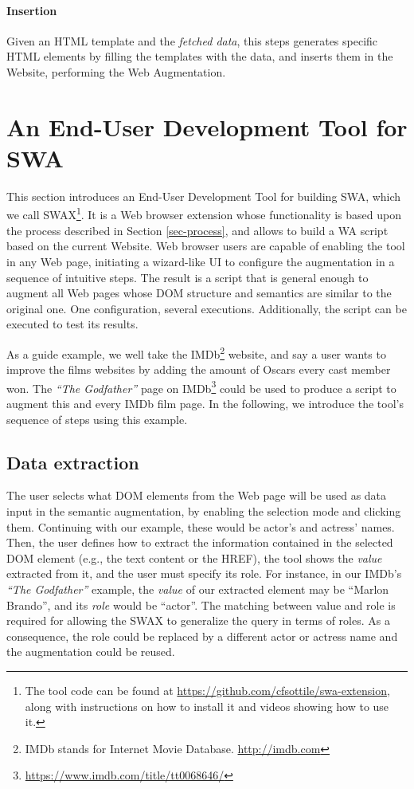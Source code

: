 \documentclass[runningheads]{llncs}
\begin{document}
\paragraph{Insertion} Given an HTML template and the \textit{fetched data}, this steps generates specific HTML elements by filling the templates with the data, and inserts them in the Website, performing the Web Augmentation.


\section{An End-User Development Tool for SWA}
\label{sec-tool}

This section introduces an End-User Development Tool for building SWA, which we call SWAX\footnote{The tool code can be found at \url{https://github.com/cfsottile/swa-extension}, along with instructions on how to install it and videos showing how to use it.
}. It is a Web browser extension whose functionality is based upon the process described in Section \ref{sec-process}, and allows to build a WA script based on the current Website. Web browser users are capable of enabling the tool in any Web page, initiating a wizard-like UI to configure the augmentation in a sequence of intuitive steps. The result is a script that is general enough to augment all Web pages whose DOM structure and semantics are similar to the original one. One configuration, several executions. Additionally, the script can be executed to test its results.

As a guide example, we well take the IMDb\footnote{IMDb stands for Internet Movie Database. \url{http://imdb.com}} website, and say a user wants to improve the films websites by adding the amount of Oscars every cast member won. The \textit{``The Godfather''} page on IMDb\footnote{\url{https://www.imdb.com/title/tt0068646/}} could be used to produce a script to augment this and every IMDb film page. In the following, we introduce the tool's sequence of steps using this example.

\subsection{Data extraction}
\label{sec-selection}

The user selects what DOM elements from the Web page will be used as data input in the semantic augmentation, by enabling the selection mode and clicking them. Continuing with our example, these would be actor's and actress' names. Then, the user defines how to extract the information contained in the selected DOM element (e.g., the text content or the HREF), the tool shows the \textit{value} extracted from it, and the user must specify its role. For instance, in our IMDb's \textit{``The Godfather''} example, the \emph{value} of our extracted element may be ``Marlon Brando'', and its \emph{role} would be ``actor''. The matching between value and role is required for allowing the SWAX to generalize the query in terms of roles. As a consequence, the role could be replaced by a different actor or actress name and the augmentation could be reused.
\end{document}
